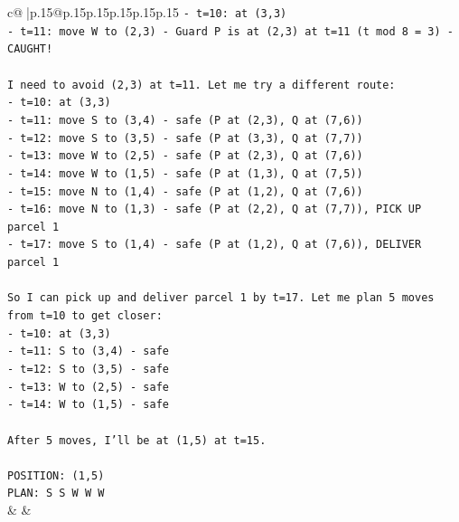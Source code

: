 \documentclass{article}
\begin{document}
{\begin{supertabular}{c@{$\;$}|p{.15\linewidth}@{}p{.15\linewidth}p{.15\linewidth}p{.15\linewidth}p{.15\linewidth}p{.15\linewidth}}
{{{\texttt{{-} t=10: at (3,3)} \\
\texttt{{-} t=11: move W to (2,3) {-} Guard P is at (2,3) at t=11 (t mod 8 = 3) {-} CAUGHT!} \\
\\ 
\texttt{I need to avoid (2,3) at t=11. Let me try a different route:} \\
\texttt{{-} t=10: at (3,3)} \\
\texttt{{-} t=11: move S to (3,4) {-} safe (P at (2,3), Q at (7,6))} \\
\texttt{{-} t=12: move S to (3,5) {-} safe (P at (3,3), Q at (7,7))} \\
\texttt{{-} t=13: move W to (2,5) {-} safe (P at (2,3), Q at (7,6))} \\
\texttt{{-} t=14: move W to (1,5) {-} safe (P at (1,3), Q at (7,5))} \\
\texttt{{-} t=15: move N to (1,4) {-} safe (P at (1,2), Q at (7,6))} \\
\texttt{{-} t=16: move N to (1,3) {-} safe (P at (2,2), Q at (7,7)), PICK UP parcel 1} \\
\texttt{{-} t=17: move S to (1,4) {-} safe (P at (1,2), Q at (7,6)), DELIVER parcel 1} \\
\\ 
\texttt{So I can pick up and deliver parcel 1 by t=17. Let me plan 5 moves from t=10 to get closer:} \\
\texttt{{-} t=10: at (3,3)} \\
\texttt{{-} t=11: S to (3,4) {-} safe} \\
\texttt{{-} t=12: S to (3,5) {-} safe} \\
\texttt{{-} t=13: W to (2,5) {-} safe} \\
\texttt{{-} t=14: W to (1,5) {-} safe} \\
\\ 
\texttt{After 5 moves, I'll be at (1,5) at t=15.} \\
\\ 
\texttt{POSITION: (1,5)} \\
\texttt{PLAN: S S W W W} \\
            }
        }
    }
    & & \\ \\


\end{supertabular}}
\end{document}
